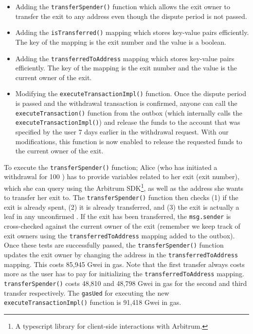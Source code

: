 \begin{itemize}
\item Adding the \texttt{transferSpender()} function which allows the exit owner to transfer the exit to any \layerone address even though the dispute period is not passed.
\item Adding the \texttt{isTransferred()} mapping which stores key-value pairs efficiently. The key of the mapping is the exit number and the value is a boolean.
\item Adding the \texttt{transferredToAddress} mapping which stores key-value pairs efficiently. The key of the mapping is the exit number and the value is the current owner of the exit.
\item Modifying the \texttt{executeTransactionImpl()} function. Once the dispute period is passed and the withdrawal transaction is confirmed, anyone can call the \texttt{executeTransaction()} function from the outbox (which internally calls the \texttt{executeTransactionImpl()}) and release the funds to the account that was specified by the user 7 days earlier in the \layertwo withdrawal request. With our modifications, this function is now enabled to release the requested funds to the current owner of the exit.
 \end{itemize}
To execute the \texttt{transferSpender()} function; Alice (who has initiated a withdrawal for 100 \ethtwo) has to provide variables related to her exit (\eg exit number), which she can query using the Arbitrum SDK\footnote{A typescript library for client-side interactions with Arbitrum.}, as well as the \layerone address she wants to transfer her exit to. The \texttt{transferSpender()} function then checks (1) if the exit is already spent, (2) it is already transferred, and (3) the exit is actually a leaf in any unconfirmed \rblock. If the exit has been transferred, the \texttt{msg.sender} is cross-checked against the current owner of the exit (remember we keep track of exit owners using the \texttt{transferredToAddress} mapping added to the outbox). Once these tests are successfully passed, the \texttt{transferSpender()} function updates the exit owner by changing the address in the \texttt{transferredToAddress} mapping. This costs  85,945 Gwei in \layerone gas. Note that the first transfer always costs more as the user has to pay for initializing the \texttt{transferredToAddress} mapping. \texttt{transferSpender()} costs 48,810 and 48,798 Gwei in \layerone gas for the second and third transfer respectively. The \texttt{gasUed} for executing the new \texttt{executeTransactionImpl()} function is 91,418 Gwei in \layerone gas.


